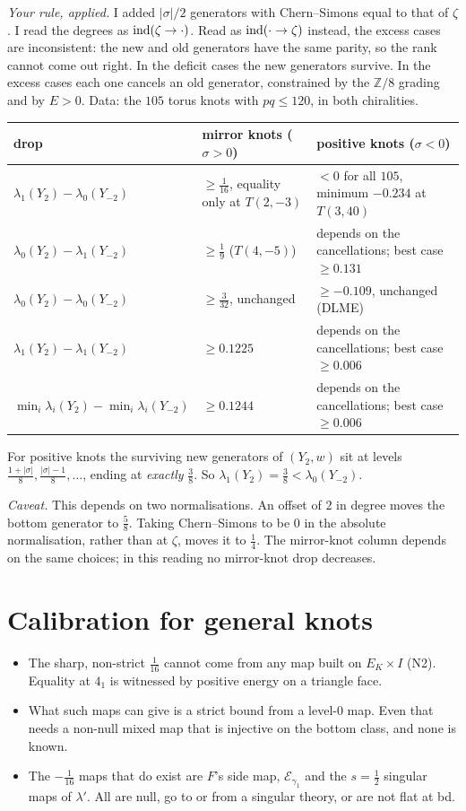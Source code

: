 \documentclass[10pt]{amsart}
\newcommand{\st}[1]{\par\noindent\textit{#1}\enspace}
\begin{document}
\st{Your rule, applied.} I added $|\sigma|/2$ generators with Chern--Simons equal to that of
$\zeta$. I read the degrees as ${\rm ind}(\zeta\to\cdot)$. Read as ${\rm ind}(\cdot\to\zeta)$
instead, the excess cases are inconsistent: the new and old generators have the same parity,
so the rank cannot come out right. In the deficit cases the new generators survive. In the
excess cases each one cancels an old generator, constrained by the $\mathbb Z/8$ grading and
by $E>0$. Data: the $105$ torus knots with $pq\le120$, in both chiralities.

\begin{center}\small
\begin{tabular}{lll}
drop & mirror knots ($\sigma>0$) & positive knots ($\sigma<0$)\\\hline
$\lambda_1(Y_2)-\lambda_0(Y_{-2})$ & $\ge\frac1{16}$, equality only at $T(2,-3)$ & $<0$ for all $105$, minimum $-0.234$ at $T(3,40)$\\
$\lambda_0(Y_2)-\lambda_1(Y_{-2})$ & $\ge\frac19$ ($T(4,-5)$) & depends on the cancellations; best case $\ge0.131$\\
$\lambda_0(Y_2)-\lambda_0(Y_{-2})$ & $\ge\frac3{32}$, unchanged & $\ge-0.109$, unchanged (DLME)\\
$\lambda_1(Y_2)-\lambda_1(Y_{-2})$ & $\ge0.1225$ & depends on the cancellations; best case $\ge0.006$\\
$\min_i\lambda_i(Y_2)-\min_i\lambda_i(Y_{-2})$ & $\ge0.1244$ & depends on the cancellations; best case $\ge0.006$
\end{tabular}
\end{center}

\noindent For positive knots the surviving new generators of $(Y_2,w)$ sit at levels
$\frac{1+|\sigma|}8,\frac{|\sigma|-1}8,\dots$, ending at \emph{exactly} $\frac38$. So
$\lambda_1(Y_2)=\frac38<\lambda_0(Y_{-2})$.

\emph{Caveat.} This depends on two normalisations. An offset of $2$ in degree moves the
bottom generator to $\frac58$. Taking Chern--Simons to be $0$ in the absolute normalisation,
rather than at $\zeta$, moves it to $\frac14$. The mirror-knot column depends on the same choices; in this reading no mirror-knot drop decreases.

\section{Calibration for general knots}

\begin{itemize}
\item The sharp, non-strict $\frac1{16}$ cannot come from any map built on $E_K\times I$ (N2). Equality at $4_1$ is witnessed by positive energy on a triangle face.
\item What such maps can give is a strict bound from a level-$0$ map. Even that needs a non-null mixed map that is injective on the bottom class, and none is known.
\item The $-\frac1{16}$ maps that do exist are $F$'s side map, $\mathcal E_{\gamma_1}$ and the $s=\frac12$ singular maps of $\lambda'$. All are null, go to or from a singular theory, or are not flat at bd.
\end{itemize}
\end{document}
